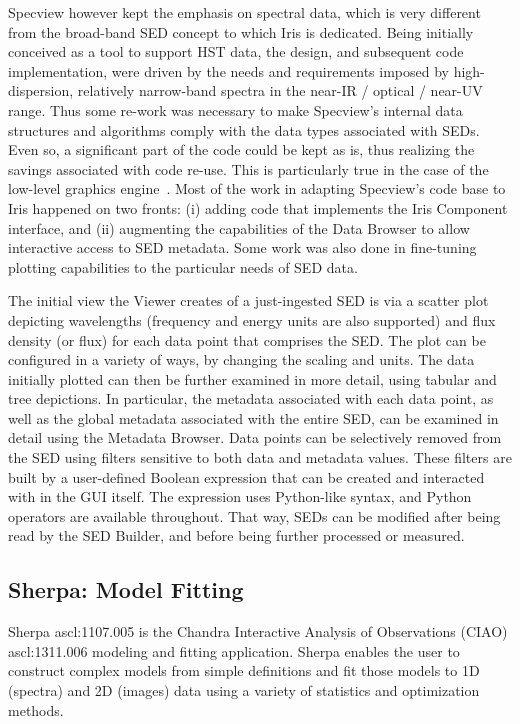 \documentclass[preprint,authoryear,5p]{elsarticle}
\begin{document}
Specview however kept the emphasis on spectral data, which is very different from
the broad-band SED concept to which Iris is dedicated. Being initially conceived
as a tool to support HST data, the design, and subsequent code implementation,
were driven by the needs and requirements imposed by high-dispersion, relatively
narrow-band spectra in the near-IR / optical / near-UV range. Thus some re-work
was necessary to make Specview's internal data structures and algorithms comply with
the data types associated with SEDs. Even so, a significant part of the code
could be kept as is, thus realizing the savings associated with code re-use.
This is particularly true in the case of the low-level graphics
engine~\citep{2000ASPC..216...79B}. Most of the work in adapting Specview's code
base to Iris happened on two fronts: (i) adding code that implements the Iris
Component interface, and (ii) augmenting the capabilities of the Data Browser to
allow interactive access to SED metadata. Some work was also done in fine-tuning
plotting capabilities to the particular needs of SED data.

The initial view the Viewer creates of a just-ingested SED is via a scatter plot
depicting wavelengths (frequency and energy units are also supported) and flux
density (or flux) for each data point that comprises the SED. The plot can be
configured in a variety of ways, by changing the scaling and units. The data
initially plotted can then be further examined in more detail, using tabular and
tree depictions. In particular, the metadata associated with each data point, as
well as the global metadata associated with the entire SED, can be examined in
detail using the Metadata Browser. Data points can be selectively removed from
the SED using filters sensitive to both data and metadata values. These filters
are built by a user-defined Boolean expression that can be created and
interacted with in the GUI itself. The expression uses Python-like syntax, and
Python operators are available throughout. That way, SEDs can be modified after
being read by the SED Builder, and before being further processed or measured.

\subsection{Sherpa: Model Fitting} \label{subsec:sherpa} Sherpa ascl:1107.005 is the
Chandra Interactive Analysis of Observations (CIAO) ascl:1311.006 \citep{2006SPIE.6270E..60F}
modeling and fitting application. Sherpa enables the user to construct complex
models from simple definitions and fit those models to 1D (spectra) and 2D
(images) data using a variety of statistics and optimization methods.
\end{document}

